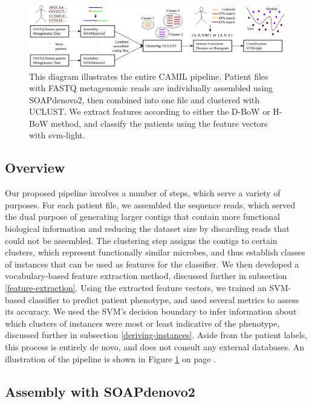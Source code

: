 
\begin{figure}[t]
\centering
\includegraphics[scale=0.5]{./mil-metagenomics-pipeline.png}
\caption{This diagram illustrates the entire CAMIL pipeline. Patient files with FASTQ metagenomic reads are individually assembled using SOAPdenovo2, then combined into one file and clustered with UCLUST. We extract features according to either the D-BoW or H-BoW method, and classify the patients using the feature vectors with svm-light.} \label{pipeline}
\end{figure}

\subsection{Overview}

Our proposed pipeline involves a number of steps, which serve a variety of purposes. For each patient file, we assembled the sequence reads, which served the dual purpose of generating larger contigs that contain more functional biological information and reducing the dataset size by discarding reads that could not be assembled. The clustering step assigns the contigs to certain clusters, which represent functionally similar microbes, and thus establish classes of instances that can be used as features for the classifier. We then developed a vocabulary-based feature extraction method, discussed further in subsection \ref{feature-extraction}. Using the extracted feature vectors, we trained an SVM-based classifier to predict patient phenotype, and used several metrics to assess its accuracy. We used the SVM's decision boundary to infer information about which clusters of instances were most or least indicative of the phenotype, discussed further in subsection \ref{deriving-instances}. Aside from the patient labels, this process is entirely de novo, and does not consult any external databases. An illustration of the pipeline is shown in Figure \ref{pipeline} on page \pageref{pipeline}.

\subsection{Assembly with SOAPdenovo2}

